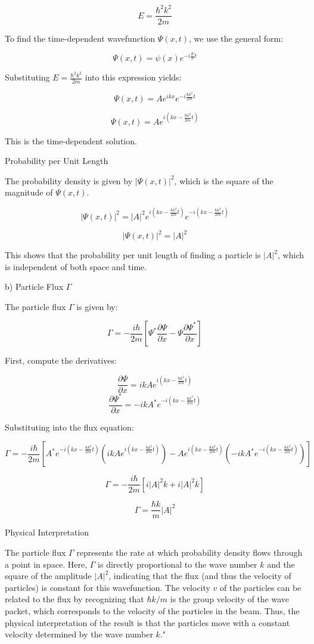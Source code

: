 \[ E = \frac{\hbar^2k^2}{2m} \]

To find the time-dependent wavefunction \( \Psi(x,t) \), we use the general form:

\[ \Psi(x,t) = \psi(x)e^{-i\frac{E}{\hbar}t} \]

Substituting \( E = \frac{\hbar^2k^2}{2m} \) into this expression yields:

\[ \Psi(x,t) = Ae^{ikx}e^{-i\frac{\hbar k^2}{2m}t} \]

\[ \Psi(x,t) = Ae^{i(kx - \frac{\hbar k^2}{2m}t)} \]

This is the time-dependent solution.

Probability per Unit Length

The probability density is given by \( |\Psi(x,t)|^2 \), which is the square of the magnitude of \( \Psi(x,t) \).

\[ |\Psi(x,t)|^2 = |A|^2e^{i(kx - \frac{\hbar k^2}{2m}t)}e^{-i(kx - \frac{\hbar k^2}{2m}t)} \]

\[ |\Psi(x,t)|^2 = |A|^2 \]

This shows that the probability per unit length of finding a particle is \( |A|^2 \), which is independent of both space and time.

b) Particle Flux \( \Gamma \)

The particle flux \( \Gamma \) is given by:

\[ \Gamma = -\frac{i\hbar}{2m}\left[ \Psi^{*}\frac{\partial\Psi}{\partial x} - \Psi\frac{\partial\Psi^{*}}{\partial x} \right] \]

First, compute the derivatives:

\[ \frac{\partial\Psi}{\partial x} = ikAe^{i(kx - \frac{\hbar k^2}{2m}t)} \]
\[ \frac{\partial\Psi^{*}}{\partial x} = -ikA^{*}e^{-i(kx - \frac{\hbar k^2}{2m}t)} \]

Substituting into the flux equation:

\[ \Gamma = -\frac{i\hbar}{2m}\left[ A^{*}e^{-i(kx - \frac{\hbar k^2}{2m}t)}(ikAe^{i(kx - \frac{\hbar k^2}{2m}t)}) - Ae^{i(kx - \frac{\hbar k^2}{2m}t)}(-ikA^{*}e^{-i(kx - \frac{\hbar k^2}{2m}t)}) \right] \]

\[ \Gamma = -\frac{i\hbar}{2m}\left[ i|A|^2k + i|A|^2k \right] \]

\[ \Gamma = \frac{\hbar k}{m}|A|^2 \]

Physical Interpretation

The particle flux \( \Gamma \) represents the rate at which probability density flows through a point in space. Here, \( \Gamma \) is directly proportional to the wave number \( k \) and the square of the amplitude \( |A|^2 \), indicating that the flux (and thus the velocity of particles) is constant for this wavefunction. The velocity \( v \) of the particles can be related to the flux by recognizing that \( \hbar k/m \) is the group velocity of the wave packet, which corresponds to the velocity of the particles in the beam. Thus, the physical interpretation of the result is that the particles move with a constant velocity determined by the wave number \( k \)."



